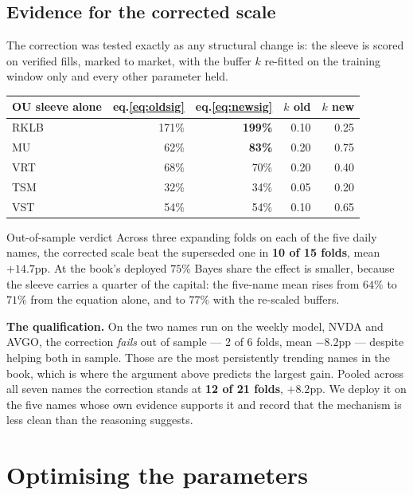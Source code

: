 \documentclass[11pt]{article}
\begin{document}
\subsection{Evidence for the corrected scale}\label{sec:sigmaev}

The correction was tested exactly as any structural change is: the sleeve is scored on verified
fills, marked to market, with the buffer $k$ re-fitted on the training window only and every
other parameter held.

\begin{table}[H]\centering\small
\begin{tabular}{lrrrr}
\toprule
\textbf{OU sleeve alone} & \textbf{eq.\eqref{eq:oldsig}} & \textbf{eq.\eqref{eq:newsig}} &
\textbf{$k$ old} & \textbf{$k$ new}\\
\midrule
RKLB & 171\% & \textbf{199\%} & 0.10 & 0.25\\
MU   & 62\%  & \textbf{83\%}  & 0.20 & 0.75\\
VRT  & 68\%  & 70\%           & 0.20 & 0.40\\
TSM  & 32\%  & 34\%           & 0.05 & 0.20\\
VST  & 54\%  & 54\%           & 0.10 & 0.65\\
\bottomrule
\end{tabular}
\end{table}

\begin{keybox}{Out-of-sample verdict}
Across three expanding folds on each of the five daily names, the corrected scale beat the
superseded one in \textbf{10 of 15 folds}, mean $+14.7$pp. At the book's deployed $75\%$ Bayes
share the effect is smaller, because the sleeve carries a quarter of the capital: the five-name
mean rises from $64\%$ to $71\%$ from the equation alone, and to $77\%$ with the re-scaled
buffers.

\textbf{The qualification.} On the two names run on the weekly model, NVDA and AVGO, the
correction \emph{fails} out of sample --- 2 of 6 folds, mean $-8.2$pp --- despite helping both in
sample. Those are the most persistently trending names in the book, which is where the argument
above predicts the largest gain. Pooled across all seven names the correction stands at
\textbf{12 of 21 folds}, $+8.2$pp. We deploy it on the five names whose own evidence supports it
and record that the mechanism is less clean than the reasoning suggests.
\end{keybox}

\section{Optimising the parameters}
\end{document}
